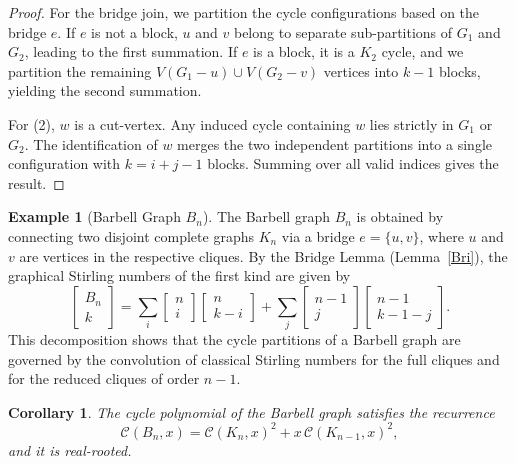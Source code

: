 \documentclass{amsart}
\newtheorem{corollary}[theorem]{Corollary}
\theoremstyle{definition}
\newtheorem{example}[theorem]{Example}
\def\st#1#2{\begin{bmatrix} #1 \\ #2 \end{bmatrix}}
\begin{document}
\begin{proof}
For the bridge join, we partition the cycle configurations based on the bridge $e$. If $e$ is not a block, $u$ and $v$ belong to separate sub-partitions of $G_1$ and $G_2$, leading to the first summation. If $e$ is a block, it is a $K_2$ cycle, and we partition the remaining $V(G_1-u) \cup V(G_2-v)$ vertices into $k-1$ blocks, yielding the second summation.

For (2), $w$ is a cut-vertex. Any induced cycle containing $w$ lies strictly in $G_1$ or $G_2$. The identification of $w$ merges the two independent partitions into a single configuration with $k = i+j-1$ blocks. Summing over all valid indices gives the result.
\end{proof}
\begin{example}[Barbell Graph $B_n$]
The Barbell graph $B_n$ is obtained by connecting two disjoint complete graphs $K_n$ via a bridge $e = \{u, v\}$, where $u$ and $v$ are vertices in the respective cliques. By the Bridge Lemma (Lemma~\ref{Bri}), the graphical Stirling numbers of the first kind are given by
\begin{equation*}
    \st{B_n}{k} = \sum_{i} \st{n}{i} \st{n}{k-i} + \sum_{j} \st{n-1}{j} \st{n-1}{k-1-j}.
\end{equation*}
This decomposition shows that the cycle partitions of a Barbell graph are governed by the convolution of classical Stirling numbers for the full cliques and for the reduced cliques of order $n-1$.
\end{example}

\begin{corollary}
The cycle polynomial of the Barbell graph satisfies the recurrence
\begin{equation*}
    \mathcal{C}(B_n, x) = \mathcal{C}(K_n, x)^2 + x \, \mathcal{C}(K_{n-1}, x)^2,
\end{equation*}
and it is real-rooted.
\end{corollary}
\end{document}
